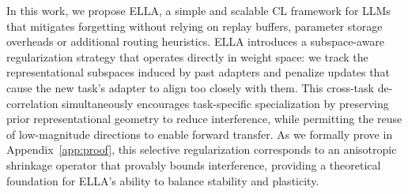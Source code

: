 \documentclass[11pt]{article}
\begin{document}
In this work, we propose ELLA, a simple and scalable CL framework for LLMs that mitigates forgetting without relying on replay buffers, parameter storage overheads or additional routing heuristics. ELLA introduces a subspace-aware regularization strategy that operates directly in weight space: we track the representational subspaces induced by past adapters and penalize updates that cause the new task's adapter to align too closely with them. %
This cross-task de-correlation simultaneously encourages task-specific specialization by preserving prior representational geometry to reduce interference, while permitting the reuse of low-magnitude directions to enable forward transfer.
As we formally prove in Appendix~\ref{app:proof}, this selective regularization corresponds to an anisotropic shrinkage operator that provably bounds interference, providing a theoretical foundation for ELLA's ability to balance stability and plasticity.
\end{document}
